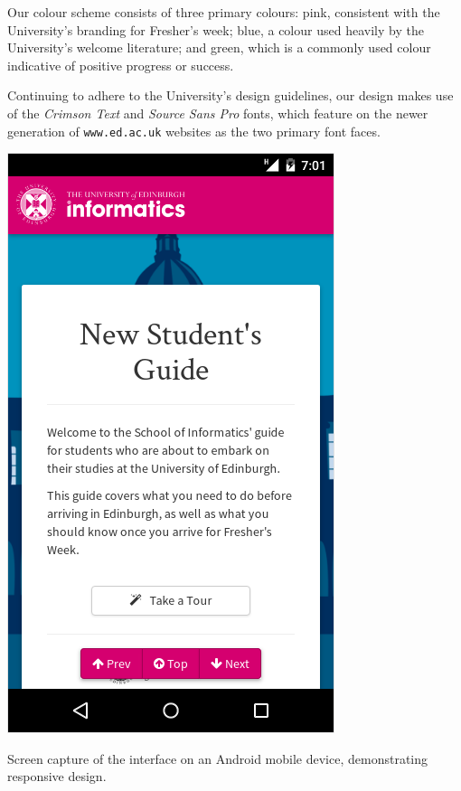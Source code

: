 \documentclass[a4paper, notoc]{tufte-handout}
\begin{document}
Our colour scheme consists of three primary colours: pink, consistent with the University's 
branding for Fresher's week; blue, a colour used heavily by the University's welcome literature; 
and green, which is a commonly used colour indicative of positive progress or success.

Continuing to adhere to the University's design guidelines, our design makes use of the 
\textit{Crimson Text} and \textit{Source Sans Pro} fonts, which feature on the newer 
generation of \texttt{www.ed.ac.uk} websites as the two primary font faces.

\begin{marginfigure}
  \includegraphics[width=\linewidth]{interface-mobile.png}
  \caption{
    \label{fig:interfacemob}
    Screen capture of the interface on an Android mobile device, demonstrating responsive
    design.
  }
\end{marginfigure}
\end{document}
